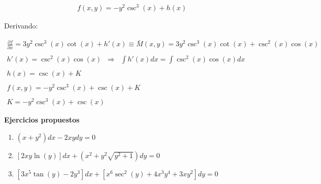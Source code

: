 \begin{equation*}
    \begin{gathered}
        f(x,y)=-y^{2}\csc^{3}(x)+h(x)
    \end{gathered}
\end{equation*}

Derivando:

\begin{equation*}
    \begin{gathered}
        \frac{\partial{f}}{\partial{x}}=3y^{2}\csc^{3}(x)\cot(x)+h'(x)\equiv\bar{M}(x,y)=3y^{2}\csc^{3}(x)\cot(x)+\csc^{2}(x)\cos(x)\\\\
        h'(x)=\csc^{2}(x)\cos(x)\;\;\Rightarrow\;\;\int h'(x)dx=\int\csc^{2}(x)\cos(x)dx\\\\
        h(x)=\csc(x)+K\\\\
        f(x,y)=-y^{2}\csc^{3}(x)+\csc(x)+K\\\\
        K=-y^{2}\csc^{3}(x)+\csc(x)
    \end{gathered}
\end{equation*}

\textbf{Ejercicios propuestos}
\begin{enumerate}
  \item \(\displaystyle \left(x+y^{2}\right)dx-2xydy=0\)
  \item \(\displaystyle \left[2xy\ln\left(y\right)\right]dx+\left(x^{2}+y^{2}\sqrt{y^{2}+1}\right)dy=0\)
  \item \(\displaystyle \left[3x^{5}\tan\left(y\right)-2y^{3}\right]dx+\left[x^{6}\sec^{2}\left(y\right)+4x^{3}y^{4}+3xy^{2}\right]dy=0\)
\end{enumerate}
\clearpage